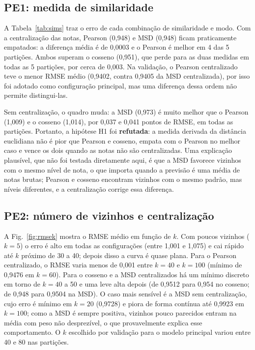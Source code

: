 \documentclass[conference]{IEEEtran}
\begin{document}
\subsection{PE1: medida de similaridade}
A Tabela~\ref{tab:sims} traz o erro de cada combina\c{c}\~ao de similaridade e modo. Com a centraliza\c{c}\~ao das notas, Pearson (0,948) e MSD (0,948) ficam praticamente empatados: a diferen\c{c}a m\'edia \'e de 0,0003 e o Pearson \'e melhor em 4 das 5 parti\c{c}\~oes. Ambos superam o cosseno (0,951), que perde para as duas medidas em todas as 5 parti\c{c}\~oes, por cerca de 0,003. Na valida\c{c}\~ao, o Pearson centralizado teve o menor RMSE m\'edio (0,9402, contra 0,9405 da MSD centralizada), por isso foi adotado como configura\c{c}\~ao principal, mas uma diferen\c{c}a dessa ordem n\~ao permite distingui-las.

Sem centraliza\c{c}\~ao, o quadro muda: a MSD (0,973) \'e muito melhor que o Pearson (1,009) e o cosseno (1,014), por 0,037 e 0,041 pontos de RMSE, em todas as parti\c{c}\~oes. Portanto, a hip\'otese H1 foi \textbf{refutada}: a medida derivada da dist\^ancia euclidiana n\~ao \'e pior que Pearson e cosseno, empata com o Pearson no melhor caso e vence os dois quando as notas n\~ao s\~ao centralizadas. Uma explica\c{c}\~ao plaus\'ivel, que n\~ao foi testada diretamente aqui, \'e que a MSD favorece vizinhos com o mesmo n\'ivel de nota, o que importa quando a previs\~ao \'e uma m\'edia de notas brutas; Pearson e cosseno encontram vizinhos com o mesmo padr\~ao, mas n\'iveis diferentes, e a centraliza\c{c}\~ao corrige essa diferen\c{c}a.

\begin{table}[t]
\caption{RMSE e MAE no teste (m\'edia $\pm$ desvio padr\~ao das 5 parti\c{c}\~oes). $k$: mediana do valor escolhido por valida\c{c}\~ao; Cob.: cobertura. Em negrito, a melhor configura\c{c}\~ao na valida\c{c}\~ao.}
\label{tab:sims}
\centering
\footnotesize

\end{table}

\subsection{PE2: n\'umero de vizinhos e centraliza\c{c}\~ao}
A Fig.~\ref{fig:rmsek} mostra o RMSE m\'edio em fun\c{c}\~ao de $k$. Com poucos vizinhos ($k=5$) o erro \'e alto em todas as configura\c{c}\~oes (entre 1,001 e 1,075) e cai r\'apido at\'e $k$ pr\'oximo de 30 a 40; depois disso a curva \'e quase plana. Para o Pearson centralizado, o RMSE varia menos de 0,001 entre $k=40$ e $k=100$ (m\'inimo de 0,9476 em $k=60$). Para o cosseno e a MSD centralizados h\'a um m\'inimo discreto em torno de $k=40$ a 50 e uma leve alta depois (de 0,9512 para 0,954 no cosseno; de 0,948 para 0,9504 na MSD). O caso mais sens\'ivel \'e a MSD sem centraliza\c{c}\~ao, cujo erro \'e m\'inimo em $k=20$ (0,9728) e piora de forma cont\'inua at\'e 0,9923 em $k=100$; como a MSD \'e sempre positiva, vizinhos pouco parecidos entram na m\'edia com peso n\~ao desprez\'ivel, o que provavelmente explica esse comportamento. O $k$ escolhido por valida\c{c}\~ao para o modelo principal variou entre 40 e 80 nas parti\c{c}\~oes.
\end{document}
